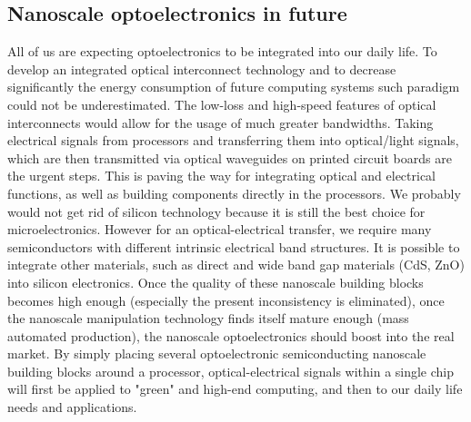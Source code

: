
\subsection{Nanoscale optoelectronics in future}
All of us are expecting optoelectronics to be integrated into our daily life. To develop an integrated optical interconnect technology and to decrease significantly the energy consumption of future computing systems such paradigm could not be underestimated. The low-loss and high-speed features of optical interconnects would allow for the usage of much greater bandwidths. Taking electrical signals from processors and transferring them into optical/light signals, which are then transmitted via optical waveguides on printed circuit boards are the urgent steps. This is paving the way for integrating optical and electrical functions, as well as building components directly in the processors. 
We probably would not get rid of silicon technology because it is still the best choice for microelectronics. However for an optical-electrical transfer, we require many semiconductors with different intrinsic electrical band structures. It is possible to integrate other materials, such as direct and wide band gap materials (CdS, ZnO) into silicon electronics. 
Once the quality of these nanoscale building blocks becomes high enough (especially the present inconsistency is eliminated), once the nanoscale manipulation technology finds itself mature enough (mass automated production), the nanoscale optoelectronics should boost into the real market. By simply placing several optoelectronic semiconducting nanoscale building blocks around a processor, optical-electrical signals within a single chip will first be applied to "green" and high-end computing, and then to our daily life needs and applications. 


